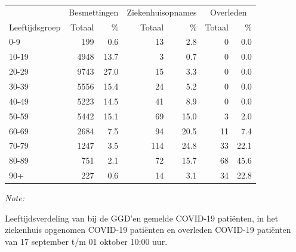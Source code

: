 \documentclass[
  english,
  man,floatsintext]{apa6}
\begin{document}
\begin{table}[H]
\centering\begingroup\fontsize{11}{13}\selectfont

\begin{threeparttable}
\begin{tabular}{lrrrrrr}
\toprule
\multicolumn{1}{c}{ } & \multicolumn{2}{c}{Besmettingen} & \multicolumn{2}{c}{Ziekenhuisopnames} & \multicolumn{2}{c}{Overleden} \\
\cmidrule(l{3pt}r{3pt}){2-3} \cmidrule(l{3pt}r{3pt}){4-5} \cmidrule(l{3pt}r{3pt}){6-7}
Leeftijdsgroep & Totaal & \% & Totaal & \% & Totaal & \%\\
\midrule
0-9 & 199 & 0.6 & 13 & 2.8 & 0 & 0.0\\
10-19 & 4948 & 13.7 & 3 & 0.7 & 0 & 0.0\\
20-29 & 9743 & 27.0 & 15 & 3.3 & 0 & 0.0\\
30-39 & 5556 & 15.4 & 24 & 5.2 & 0 & 0.0\\
40-49 & 5223 & 14.5 & 41 & 8.9 & 0 & 0.0\\
50-59 & 5442 & 15.1 & 69 & 15.0 & 3 & 2.0\\
60-69 & 2684 & 7.5 & 94 & 20.5 & 11 & 7.4\\
70-79 & 1247 & 3.5 & 114 & 24.8 & 33 & 22.1\\
80-89 & 751 & 2.1 & 72 & 15.7 & 68 & 45.6\\
90+ & 227 & 0.6 & 14 & 3.1 & 34 & 22.8\\
\bottomrule
\end{tabular}
\begin{tablenotes}
\item \textit{Note: } 
\item Leeftijdsverdeling van bij de GGD’en gemelde COVID-19 patiënten, in het ziekenhuis opgenomen COVID-19 patiënten en overleden COVID-19 patiënten van 17 september t/m 01 oktober 10:00 uur.
\end{tablenotes}
\end{threeparttable}
\endgroup{}
\end{table}
\end{document}
